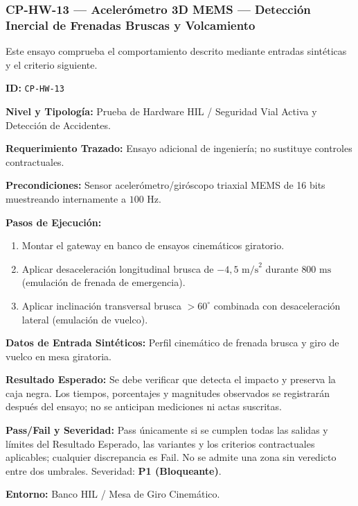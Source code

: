 \subsubsection*{CP-HW-13 — Acelerómetro 3D MEMS — Detección Inercial de Frenadas Bruscas y Volcamiento}\label{sec:9-cp-hw-13}
Este ensayo comprueba el comportamiento descrito mediante entradas sintéticas y el criterio siguiente.

\par\noindent\textbf{ID:} \texttt{C\allowbreak{}P\allowbreak{}-\allowbreak{}H\allowbreak{}W\allowbreak{}-\allowbreak{}1\allowbreak{}3\allowbreak{}}\par
\par\noindent\textbf{Nivel y Tipología:} Prueba de Hardware HIL / Seguridad Vial Activa y Detección de Accidentes.\par
\par\noindent\textbf{Requerimiento Trazado:} Ensayo adicional de ingeniería; no sustituye controles contractuales.\par
\par\noindent\textbf{Precondiciones:} Sensor acelerómetro/giróscopo triaxial MEMS de 16 bits muestreando internamente a \(100\text{ Hz}\).\par
\par\noindent\textbf{Pasos de Ejecución:} \par
\begin{enumerate}
\item Montar el gateway en banco de ensayos cinemáticos giratorio.
\item Aplicar desaceleración longitudinal brusca de \(-4{,}5\text{ m/s}^2\) durante \(800\text{ ms}\) (emulación de frenada de emergencia).
\item Aplicar inclinación transversal brusca \(> 60^\circ\) combinada con desaceleración lateral (emulación de vuelco).
\end{enumerate}
\par\noindent\textbf{Datos de Entrada Sintéticos:} Perfil cinemático de frenada brusca y giro de vuelco en mesa giratoria.\par
\par\noindent\textbf{Resultado Esperado:} Se debe verificar que detecta el impacto y preserva la caja negra. Los tiempos, porcentajes y magnitudes observados se registrarán después del ensayo; no se anticipan mediciones ni actas suscritas.\par
\par\noindent\textbf{Pass/Fail y Severidad:} Pass únicamente si se cumplen todas las salidas y límites del Resultado Esperado, las variantes y los criterios contractuales aplicables; cualquier discrepancia es Fail. No se admite una zona sin veredicto entre dos umbrales. Severidad: \textbf{P1 (Bloqueante)}.\par
\par\noindent\textbf{Entorno:} Banco HIL / Mesa de Giro Cinemático.\par






